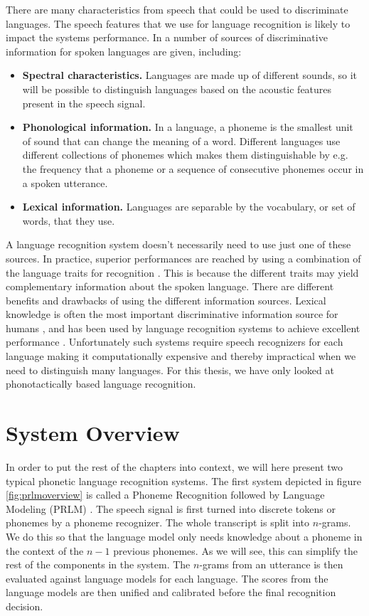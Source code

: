 There are many characteristics from speech that could be used to discriminate languages. The speech features that we use for language recognition is likely to impact the systems performance. In \cite[p. 801]{lidbok} a number of sources of discriminative information for spoken languages are given, including:

\begin{itemize}
\item \textbf{Spectral characteristics.} Languages are made up of different sounds, so it will be possible to distinguish languages based on the acoustic features present in the speech signal.
\item \textbf{Phonological information.} In a language, a phoneme is the smallest unit of sound that can change the meaning of a word. Different languages use different collections of phonemes which makes them distinguishable by e.g. the frequency that a phoneme or a sequence of consecutive phonemes occur in a spoken utterance.
\item \textbf{Lexical information.} Languages are separable by the vocabulary, or set of words, that they use.
\end{itemize}

A language recognition system doesn't necessarily need to use just one of these sources. In practice, superior performances are reached by using a combination of the language traits for recognition \cite[p. 818]{lidbok}. This is because the different traits may yield complementary information about the spoken language. There are different benefits and drawbacks of using the different information sources. Lexical knowledge is often the most important discriminative information source for humans \cite[p. 787]{lidbok}, and has been used by language recognition systems to achieve excellent performance \cite[p. 803]{lidbok}. Unfortunately such systems require speech recognizers for each language making it computationally expensive and thereby impractical when we need to distinguish many languages. For this thesis, we have only looked at phonotactically based language recognition.

\section{System Overview}
\label{sect:sysoverview}

In order to put the rest of the chapters into context, we will here present two typical phonetic language recognition systems. The first system depicted in figure \ref{fig:prlmoverview} is called a Phoneme Recognition followed by Language Modeling (PRLM) \cite[p. 817]{lidbok}. The speech signal is first turned into discrete tokens or phonemes by a phoneme recognizer.  The whole transcript is split into $n$-grams. We do this so that the language model only needs knowledge about a phoneme in the context of the $n-1$ previous phonemes. As we will see, this can simplify the rest of the components in the system. The $n$-grams from an utterance is then evaluated against language models for each language. The scores from the language models are then unified and calibrated before the final recognition decision.


